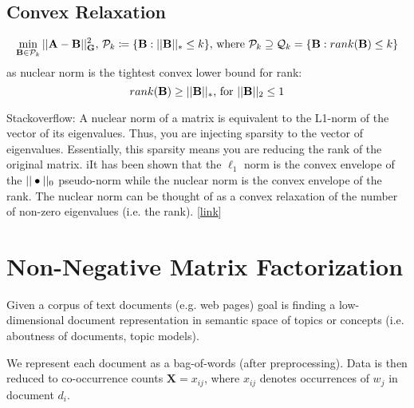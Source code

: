 \documentclass[12pt]{article}
\begin{document}
\subsection{Convex Relaxation}
\[ \min_{\mathbf{B}\in \mathcal{P}_k} ||\mathbf{A-B}||^2_{\mathbf{G}} \text{, } \mathcal{P}_k \coloneqq \{ \mathbf{B}: ||\mathbf{B}||_* \leq k \} \text{, where } \mathcal{P}_k\supseteq \mathcal{Q}_k = \{ \mathbf{B}: rank(\mathbf{B}) \leq k \} \]
as nuclear norm is the tightest convex lower bound for rank:
\[ rank(\mathbf{B}) \geq ||\mathbf{B}||_* \text{, for } ||\mathbf{B}||_2 \leq 1 \]
\par Stackoverflow: A nuclear norm of a matrix is equivalent to the L1-norm of the vector of its eigenvalues. Thus, you are injecting sparsity to the vector of eigenvalues. Essentially, this sparsity means you are reducing the rank of the original matrix. iIt has been shown that the $\ell_1$ norm is the convex envelope of the $||\bullet||_0$ pseudo-norm while the nuclear norm is the convex envelope of the rank. The nuclear norm can be thought of as a convex relaxation of the number of non-zero eigenvalues (i.e. the rank). [\href{https://math.stackexchange.com/questions/164208/why-is-minimizing-the-nuclear-norm-of-a-matrix-a-good-surrogate-for-minimizing-t}{link}]

\section{Non-Negative Matrix Factorization}
Given a corpus of text documents (e.g. web pages) goal is finding a low-dimensional document representation in semantic
space of topics or concepts (i.e. aboutness of documents, topic models).
\par We represent each document as a bag-of-words (after preprocessing). Data is then reduced to co-occurrence counts $\mathbf{X} = x_{ij}$, where $x_{ij}$ denotes occurrences of $w_j$ in document $d_i$.
\end{document}
